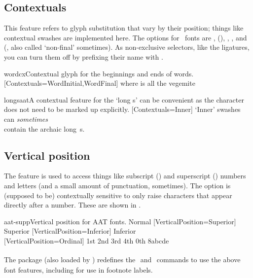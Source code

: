 \subsection{Contextuals} \label{sec:contextuals}
This feature refers to glyph substitution that vary by their position;
things like contextual swashes are implemented here.
The options for \AAT\ fonts are
,  (), ,
, and  (, also called `non-final' sometimes). As
non-exclusive selectors, like the ligatures, you can turn them off
by prefixing their name with .

\begin{Xexample}{wordcx}{Contextual glyph for the beginnings and ends of words.}
  \newfontface{}
      [Contextuals={WordInitial,WordFinal}]
  \fancy where is all the vegemite
\end{Xexample}

\begin{Xexample}{longsaat}{A contextual feature for the `long s' can be convenient as the character does not need to be marked up explicitly.}
  [Contextuals=Inner]
  `Inner' swashes can \emph{sometimes}    \\
   contain the archaic long~s.
\end{Xexample}



\subsection{Vertical position}
The  feature is used to access things like
subscript () and superscript () numbers and
letters (and a small amount of punctuation, sometimes).
The  option is (supposed to be)
contextually sensitive to only raise characters that appear directly
after a number.
These are shown in .

\begin{Xexample}{aat-supp}{Vertical position for AAT fonts.}
   Normal
  [VerticalPosition=Superior]
   Superior
  [VerticalPosition=Inferior]
   Inferior                \\
  [VerticalPosition=Ordinal]
   1st 2nd 3rd 4th 0th 8abcde
\end{Xexample}

The  package
(also loaded by )
redefines the \cmd\textsubscript\ and
\cmd\textsuperscript\ commands to use the above font features,
including for use in footnote labels.

